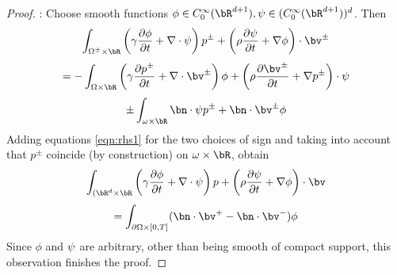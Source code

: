 \begin{proof}: Choose smooth functions $\phi \in C^{\infty}_0(\bR^{d+1}), {\bf \psi} \in  (C^{\infty}_0(\bR^{d+1}))^d$. Then
\[
\int_{\Omega^{\pm} \times \bR}\left (\gamma \frac{\partial \phi}{\partial t} +
\nabla \cdot {\bf \psi}\right)p^{\pm} + \left(\rho\frac{\partial {\bf
    \psi}}{\partial t}
  + \nabla \phi\right) \cdot \bv^{\pm}
\]
\[
= - \int_{\Omega \times \bR}\left (\gamma \frac{\partial p^{\pm}}{\partial t} +
\nabla \cdot \bv^{\pm}\right) \phi + \left(\rho\frac{\partial \bv^{\pm}}{\partial t}
  + \nabla p^{\pm}\right) \cdot {\bf \psi}
\]
\begin{equation}
\label{eqn:rhs1}
\pm \int_{\omega \times \bR} \bn \cdot {\bf \psi} p^{\pm} + \bn
  \cdot \bv^{\pm} \phi
\end{equation}
Adding equations \ref{eqn:rhs1} for the two choices of sign and taking into
account that $p^{\pm}$ coincide (by construction) on $\omega \times \bR$, obtain
\[
\int_{(\bR^d \times \bR}\left (\gamma \frac{\partial \phi}{\partial t} +
\nabla \cdot {\bf \psi}\right)p + \left(\rho\frac{\partial {\bf
    \psi}}{\partial t}
  + \nabla \phi\right) \cdot \bv
\]
\[
= \int_{\partial \Omega \times [0,T]} (\bn \cdot \bv^{+} -  \bn
  \cdot \bv^{-}) \phi
\]
Since $\phi$ and ${\bf \psi}$ are arbitrary, other than being smooth of compact support, this observation finishes the proof.
\end{proof}
